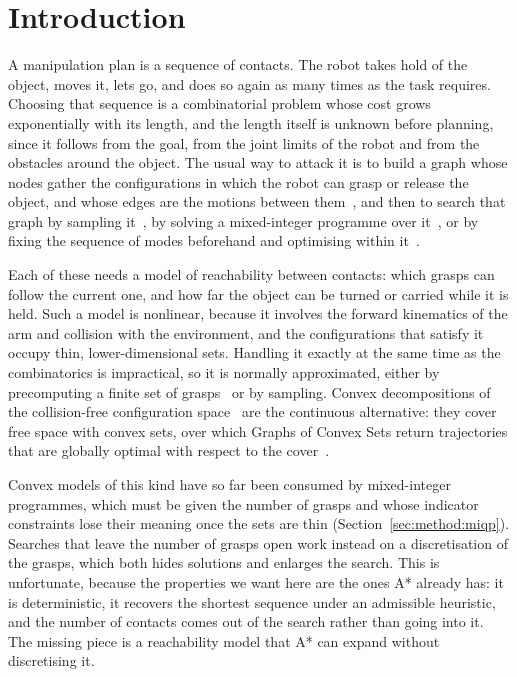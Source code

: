 \section{Introduction}
\label{sec:introduction}

A manipulation plan is a sequence of contacts. The robot takes hold of the
object, moves it, lets go, and does so again as many times as the task
requires. Choosing that sequence is a combinatorial problem whose cost grows
exponentially with its length, and the length itself is unknown before
planning, since it follows from the goal, from the joint limits of the robot
and from the obstacles around the object. The usual way to attack it is to
build a graph whose nodes gather the configurations in which the robot can
grasp or release the object, and whose edges are the motions between
them~\cite{simeon2004manipulation}, and then to search that graph by sampling
it~\cite{hauser2010multimodal,mirabel2016hpp}, by solving a mixed-integer
programme over it~\cite{deits2014footstep}, or by fixing the sequence of modes
beforehand and optimising within
it~\cite{toussaint2015lgp,levit2025regrasp}.

Each of these needs a model of reachability between contacts: which grasps can
follow the current one, and how far the object can be turned or carried while
it is held. Such a model is nonlinear, because it involves the forward
kinematics of the arm and collision with the environment, and the
configurations that satisfy it occupy thin, lower-dimensional sets. Handling
it exactly at the same time as the combinatorics is impractical, so it is
normally approximated, either by precomputing a finite set of
grasps~\cite{wan2017regrasp,lertkultanon2018certified} or by sampling.
Convex decompositions of the collision-free configuration
space~\cite{deits2015computing,dai2024certified,petersen2023growing,werner2024approximating}
are the continuous alternative: they cover free space with convex sets, over
which Graphs of Convex Sets return trajectories that are globally optimal with
respect to the cover~\cite{marcucci2023motion}.

Convex models of this kind have so far been consumed by mixed-integer
programmes, which must be given the number of grasps and whose indicator
constraints lose their meaning once the sets are thin
(Section~\ref{sec:method:miqp}). Searches that leave the number of grasps open
work instead on a discretisation of the grasps, which both hides solutions and
enlarges the search. This is unfortunate, because the properties we want here
are the ones A* already has: it is deterministic, it recovers the shortest
sequence under an admissible heuristic, and the number of contacts comes out
of the search rather than going into it. The missing piece is a reachability
model that A* can expand without discretising it.

